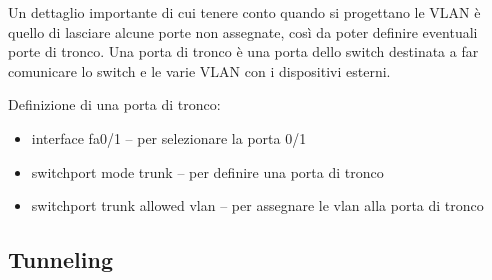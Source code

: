 Un dettaglio importante di cui tenere conto quando si progettano le VLAN è quello di lasciare alcune porte non assegnate, così da poter definire eventuali porte di tronco. Una porta di tronco è una porta dello switch destinata a far comunicare lo switch e le varie VLAN con i dispositivi esterni.

Definizione di una porta di tronco:

\begin{itemize}
    \item interface fa0/1 – per selezionare la porta 0/1
    \item switchport mode trunk – per definire una porta di tronco
    \item switchport trunk allowed vlan – per assegnare le vlan alla porta di tronco
\end{itemize}
\subsection{Tunneling}